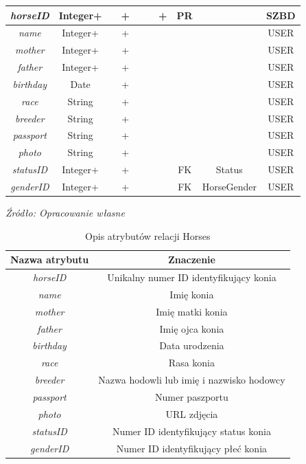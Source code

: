 \documentclass[12pt,oneside]{report}
\begin{document}
\begin{enumerate}[start=1,label={\bfseries REL\textbackslash0\arabic*}]
\begin{table}[H]
\begin{tabular}{|c|c|c|c|c|c|c|c|c|c|}
		\hline
		\textit{horseID}&Integer+&&+&&&+&PR&&SZBD\\		
		\hline			
		\textit{name}&Integer+&&+&&&&&&USER\\		
		\hline			
		\textit{mother}&Integer+&&+&&&&&&USER\\		
		\hline			
		\textit{father}&Integer+&&+&&&&&&USER\\		
		\hline			
		\textit{birthday}&Date&&+&&&&&&USER\\		
		\hline			
		\textit{race}&String&&+&&&&&&USER\\		
		\hline			
		\textit{breeder}&String&&+&&&&&&USER\\		
		\hline			
		\textit{passport}&String&&+&&&&&&USER\\		
		\hline			
		\textit{photo}&String&&+&&&&&&USER\\		
		\hline		
		\textit{statusID}&Integer+&&+&&&&FK&Status&USER\\		
		\hline
		\textit{genderID}&Integer+&&+&&&&FK&HorseGender&USER\\		
		\hline
	\end{tabular}
\end{table}

\begin{table}[H]
	\caption{Opis atrybutów relacji Horses}
	\textit{Źródło: Opracowanie własne}
	\label{HorsesAttributeDescription}
	\centering
	\begin{tabular}{|c|c|}
		\hline
		Nazwa atrybutu & Znaczenie \\
		\hline
		\textit{horseID}&Unikalny numer ID identyfikujący konia\\		
		\hline			
		\textit{name}& Imię konia\\		
		\hline			
		\textit{mother}& Imię matki konia\\		
		\hline			
		\textit{father}& Imię ojca konia\\		
		\hline			
		\textit{birthday}& Data urodzenia\\		
		\hline			
		\textit{race}& Rasa konia\\		
		\hline			
		\textit{breeder}& Nazwa hodowli lub imię i nazwisko hodowcy\\		
		\hline			
		\textit{passport}& Numer paszportu\\		
		\hline			
		\textit{photo}& URL zdjęcia\\		
		\hline		
		\textit{statusID}& Numer ID identyfikujący status konia\\		
		\hline
		\textit{genderID}&Numer ID identyfikujący płeć konia\\		
		\hline
	\end{tabular}
\end{table}
\end{enumerate}
\end{document}

